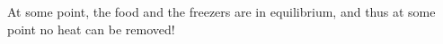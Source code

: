 At some point, the food and the freezers are in equilibrium, and thus at some point no heat can be removed!